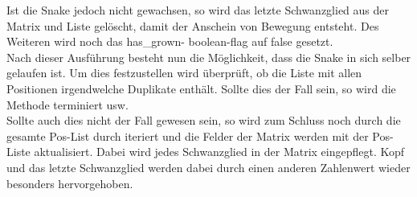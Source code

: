 Ist die Snake jedoch nicht gewachsen, so wird das letzte Schwanzglied aus der Matrix und Liste gelöscht, damit der Anschein von Bewegung entsteht. Des Weiteren wird noch das has\_grown- boolean-flag auf false gesetzt.\\
Nach dieser Ausführung besteht nun die Möglichkeit, dass die Snake in sich selber gelaufen ist. Um dies festzustellen wird überprüft, ob die Liste mit allen Positionen irgendwelche Duplikate enthält. Sollte dies der Fall sein, so wird die Methode terminiert usw.\\
Sollte auch dies nicht der Fall gewesen sein, so wird zum Schluss noch durch die gesamte Pos-List durch iteriert und die Felder der Matrix werden mit der Pos-Liste aktualisiert. Dabei wird jedes Schwanzglied in der Matrix eingepflegt. Kopf und das letzte Schwanzglied werden dabei durch einen anderen Zahlenwert wieder besonders hervorgehoben.

